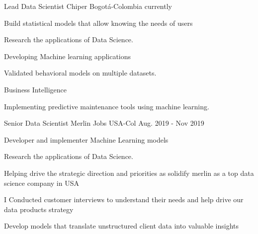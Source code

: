 

\begin{cventries}

  \cventry
    {Lead Data Scientist} %
    {Chiper} %
    {Bogotá-Colombia} %
    {currently} %
    {
      \begin{cvitems} %
        \item {Build statistical models that allow knowing the needs of users}
        \item {Research the applications of Data Science.}
        \item {Developing Machine learning applications}
        \item {Validated behavioral models on multiple datasets.}
        \item {Business Intelligence}
        \item{Implementing predictive maintenance tools using machine learning.}
      \end{cvitems}
    }

  
  \cventry
    {Senior Data Scientist} %
    {Merlin Jobs} %
    {USA-Col} %
    {Aug. 2019 - Nov 2019} %
    {
      \begin{cvitems} %
        \item {Developer and implementer Machine Learning models}
        \item {Research the applications of Data Science.}
        \item {Helping drive the strategic direction and priorities as  solidify merlin as a top data science company in USA}
        \item {I Conducted customer interviews to understand their needs and help drive our data products strategy}
        \item {Develop models that translate unstructured client data into valuable insights}
      \end{cvitems}
    }


\end{cventries}
